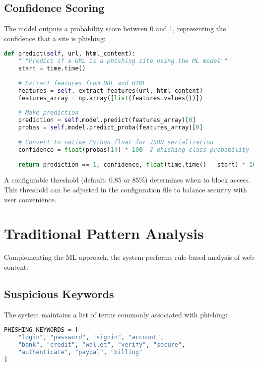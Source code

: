 \subsection{Confidence Scoring}
The model outputs a probability score between 0 and 1, representing the confidence that a site is phishing:

\begin{lstlisting}[language=Python, caption=ML Prediction Method]
def predict(self, url, html_content):
    """Predict if a URL is a phishing site using the ML model"""
    start = time.time()
    
    # Extract features from URL and HTML
    features = self._extract_features(url, html_content)
    features_array = np.array([list(features.values())])
    
    # Make prediction
    prediction = self.model.predict(features_array)[0]
    probas = self.model.predict_proba(features_array)[0]
    
    # Convert to native Python float for JSON serialization
    confidence = float(probas[1]) * 100  # phishing class probability
    
    return prediction == 1, confidence, float(time.time() - start) * 1000
\end{lstlisting}

A configurable threshold (default: 0.85 or 85\%) determines when to block access. This threshold can be adjusted in the configuration file to balance security with user convenience.

\section{Traditional Pattern Analysis}

Complementing the ML approach, the system performs rule-based analysis of web content:

\subsection{Suspicious Keywords}
The system maintains a list of terms commonly associated with phishing:

\begin{lstlisting}[language=Python, caption=Phishing Keywords]
PHISHING_KEYWORDS = [
    "login", "password", "signin", "account", 
    "bank", "credit", "wallet", "verify", "secure", 
    "authenticate", "paypal", "billing"
]
\end{lstlisting}

